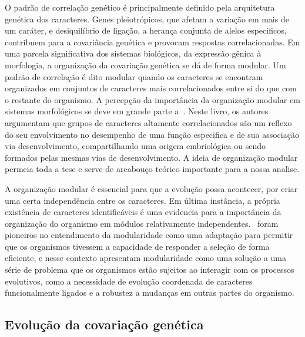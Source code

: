 \begin{refsection}
O padrão de correlação genético é principalmente definido pela arquitetura
genética dos caracteres. Genes pleiotrópicos, que afetam a variação em mais de
um caráter, e desiquilíbrio de ligação, a herança conjunta de alelos
específicos, contribuem para a covariância genética e provocam respostas
correlacionadas. Em uma parcela significativa dos sistemas biológicos, da
expressão gênica à morfologia, a organização da covariação genética se dá de
forma modular. Um padrão de correlação é dito modular quando os caracteres se
encontram organizados em conjuntos de caracteres mais correlacionados entre si
do que com o restante do organismo. A percepção da importância da organização
modular em sistemas morfológicos se deve em grande parte
a~\textcite{Olson1958-qk}. Neste livro, os autores argumentam que 
grupos de caracteres altamente correlacionados são um reflexo do seu
envolvimento no desempenho de uma função especifica e de sua associação via
desenvolvimento, compartilhando uma origem embriológica ou sendo formados
pelas mesmas vias de desenvolvimento. A ideia de organização modular permeia
toda a tese e serve de arcabouço teórico importante para a nossa
analise.

A organização modular é essencial para que a evolução possa acontecer, por
criar uma certa independência entre os caracteres. Em última instância, a
própria existência de caracteres identificáveis é uma evidencia para a
importância da organização do organismo em módulos relativamente
independentes.~\textcite{Wagner1996-ui} foram pioneiros no entendimento da
modularidade como uma adaptação para permitir que os organismos tivessem a
capacidade de responder a seleção de forma eficiente, e nesse contexto apresentam
modularidade como uma solução a uma série de problema que os organismos estão
sujeitos ao interagir com os processos evolutivos, como a necessidade de
evolução coordenada de caracteres funcionalmente ligados e a robustez a
mudanças em outras partes do organismo.

\subsection{Evolução da covariação genética}


\end{refsection}
